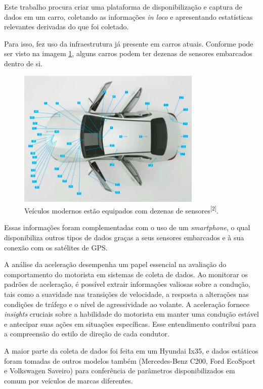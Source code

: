 Este trabalho procura criar uma plataforma de disponibilização e captura de dados em um carro, coletando as informações \textit{in loco} e apresentando estatísticas relevantes derivadas do que foi coletado.

Para isso, fez uso da infraestrutura já presente em carros atuais. Conforme pode ser visto na imagem \ref{fig:sensors_car}, alguns carros podem ter dezenas de sensores embarcados dentro de si.


\begin{figure}[hp]
    \centering
    
    \includegraphics[]{figures/sensores_carro.png}
    
    \caption{Veículos modernos estão equipados com dezenas de sensores\textsuperscript{[2]}.}
    
    \label{fig:sensors_car}
\end{figure}

Essas informações foram complementadas com o uso de um \textit{smartphone}, o qual disponibiliza outros tipos de dados graças a seus sensores embarcados e à sua conexão com os satélites de GPS.

A análise da aceleração desempenha um papel essencial na avaliação do comportamento do motorista em sistemas de coleta de dados. Ao monitorar os padrões de aceleração, é possível extrair informações valiosas sobre a condução, tais como a suavidade nas transições de velocidade, a resposta a alterações nas condições de tráfego e o nível de agressividade ao volante. A aceleração fornece \textit{insights} cruciais sobre a habilidade do motorista em manter uma condução estável e antecipar suas ações em situações específicas. Esse entendimento contribui para a compreensão do estilo de direção de cada condutor. 

A maior parte da coleta de dados foi feita em um Hyundai Ix35, e dados estáticos foram tomadas de outros modelos também (Mercedes-Benz C200, Ford EcoSport e Volkswagen Saveiro) para conferência de parâmetros disponibilizados em comum por veículos de marcas diferentes.


